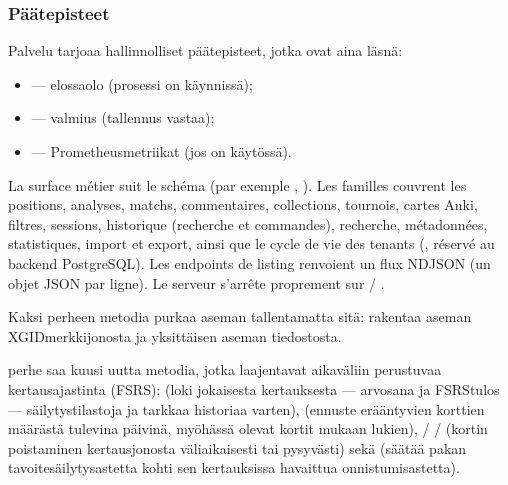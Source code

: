 \documentclass[letterpaper,10pt,finnish]{sphinxmanual}
\begin{document}
\subsubsection{Päätepisteet}
\label{\detokenize{mode_headless:points-d-acces}}
\sphinxAtStartPar
Palvelu tarjoaa hallinnolliset päätepisteet, jotka ovat aina läsnä:
\begin{itemize}
\item {} 
\sphinxAtStartPar
{} — elossaolo (prosessi on käynnissä);

\item {} 
\sphinxAtStartPar
{} — valmius (tallennus vastaa);

\item {} 
\sphinxAtStartPar
{} — Prometheus\sphinxhyphen{}metriikat (jos  on käytössä).

\end{itemize}

\sphinxAtStartPar
La surface métier suit le schéma  (par exemple
, ). Les familles couvrent les
positions, analyses, matchs, commentaires, collections, tournois, cartes Anki,
filtres, sessions, historique (recherche et commandes), recherche,
métadonnées, statistiques, import et export, ainsi que le cycle de vie des
tenants (, réservé au backend PostgreSQL). Les endpoints de
listing renvoient un flux NDJSON (un objet JSON par ligne). Le serveur
s’arrête proprement sur  / .

\sphinxAtStartPar
Kaksi \sphinxhyphen{}perheen metodia purkaa aseman tallentamatta sitä:  rakentaa aseman XGID\sphinxhyphen{}merkkijonosta ja  yksittäisen aseman \sphinxhyphen{}tiedostosta.

\sphinxAtStartPar
{}\sphinxhyphen{}perhe saa kuusi uutta metodia, jotka laajentavat aikaväliin perustuvaa kertausajastinta (FSRS):  (loki jokaisesta kertauksesta — arvosana ja FSRS\sphinxhyphen{}tulos — säilytystilastoja ja tarkkaa historiaa varten),  (ennuste erääntyvien korttien määrästä tulevina päivinä, myöhässä olevat kortit mukaan lukien),  /  /  (kortin poistaminen kertausjonosta väliaikaisesti tai pysyvästi) sekä  (säätää pakan tavoitesäilytysastetta kohti sen kertauksissa havaittua onnistumisastetta).
\end{document}
